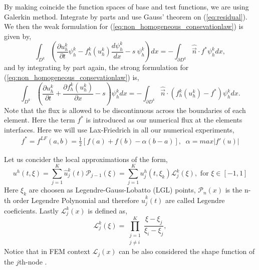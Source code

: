 \begin{frame}
	By making coincide the function spaces of base and test functions, we are using Galerkin method.
	Integrate by parts and use Gauss' theorem on (\ref{eq:residual}). We then the weak formulation for (\ref{eq:non_homogeneous_consevationlaw}) is given by,
	\begin{equation}
	\int_{D^k} \left( \frac{\partial u_h^k}{\partial t} \psi_h^k - f_h^k(u_h^k) \frac{d\psi_h^k}{dx} -s \ \psi_h^k\right) dx = 
	- \int_{\partial D^k} \hat{\vec{n}}\cdot f^{*} \psi_h^k dx,
	\label{eq:weakform}
	\end{equation}
	and by integrating by part again, the strong formulation for (\ref{eq:non_homogeneous_consevationlaw}) is,
	\begin{equation}
	\int_{D^k} \left( \frac{\partial u_h^k}{\partial t} + \frac{\partial f_h^k(u_h^k)}{\partial x} -s\right) \psi_h^k dx = 
	-\int_{\partial D^k} \hat{\vec{n}}\cdot ( f_h^k(u_h^k) - f^{*} ) \psi_h^k dx.
	\label{eq:strongfrom}
	\end{equation}
	Note that the flux is allowed to be discontinuous across the boundaries of each element. Here the term $f^{*}$ is introduced as our numerical flux at the elements interfaces. Here we will use Lax-Friedrich in all our numerical experiments,
	\begin{align}
		f^{*} = f^{LF}(a,b) = \frac{1}{2}[f(a)+f(b)-\alpha(b-a)], \;\; \alpha=max|f'(u)|
	\end{align}
\end{frame}

\begin{frame}
	Let us concider the local approximations of the form,
	\begin{equation}
		u^h(t,\xi) = \sum_{j=1}^{K} \hat{u}_j^k(t) \mathcal{P}_{j-1}(\xi)
							 = \sum_{j=1}^{K} u_j^h(t,\xi_k)\mathcal{L}_{j}^k(\xi), 
							\text{ for } \xi \in [-1,1]
	\end{equation}
	Here $\xi_k$ are choosen as Legendre-Gauss-Lobatto (LGL) points, $\mathcal{P}_{n}(x)$ is the n-th order Legendre Polynomial and therefore $\hat{u}_j^k(t)$ are called Legendre coeficients. Lastly $\mathcal{L}_{j}^k(x)$ is defined as,
	\begin{equation}
		\mathcal{L}_{j}^k(\xi) = \prod_{\substack{j = 1 \\ j\neq i}}^K \frac{\xi-\xi_j}{\xi_i-\xi_j},
	\end{equation}
	Notice that in FEM context $\mathcal{L}_{j}(x)$ can be also considered the shape function of the $j$th-node .
\end{frame}


